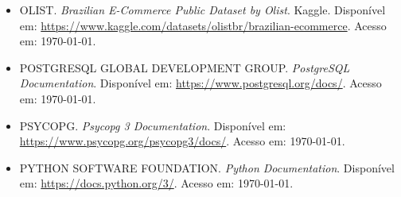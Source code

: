\documentclass[12pt,a4paper]{article}
\begin{document}
	\begin{itemize}[leftmargin=1.2cm]
		
		\item OLIST.
		\textit{Brazilian E-Commerce Public Dataset by Olist}.
		Kaggle.
		Disponível em:
		\url{https://www.kaggle.com/datasets/olistbr/brazilian-ecommerce}.
		Acesso em: \today.
		
		\item POSTGRESQL GLOBAL DEVELOPMENT GROUP.
		\textit{PostgreSQL Documentation}.
		Disponível em:
		\url{https://www.postgresql.org/docs/}.
		Acesso em: \today.
		
		\item PSYCOPG.
		\textit{Psycopg 3 Documentation}.
		Disponível em:
		\url{https://www.psycopg.org/psycopg3/docs/}.
		Acesso em: \today.
		
		\item PYTHON SOFTWARE FOUNDATION.
		\textit{Python Documentation}.
		Disponível em:
		\url{https://docs.python.org/3/}.
		Acesso em: \today.
		
	\end{itemize}
\end{document}

